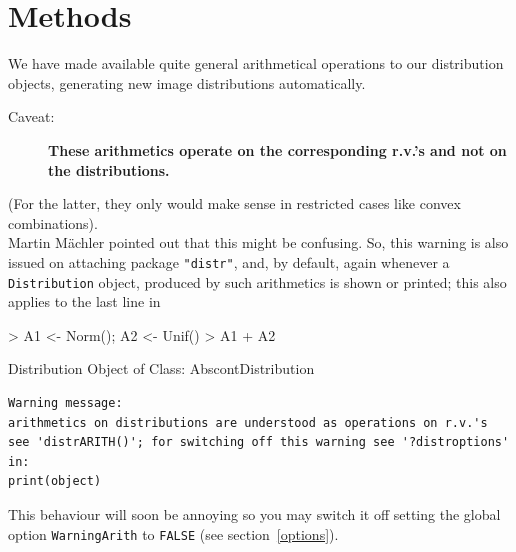 \documentclass[11pt]{article}
\newcommand{\code}[1]{{\tt #1}}
\newcommand{\pkg}[1]{{\tt "#1"}}
\begin{document}
\section{Methods}\label{methods}
%
We have made available quite general arithmetical operations to our distribution 
objects, generating new image distributions automatically.

\begin{description}
  \item[{\Large \sc Caveat:\/}] {\bf These arithmetics
operate on the corresponding r.v.'s and {\bf not} on the distributions.}
\end{description}
(For the latter, they only would make sense in restricted cases like convex 
 combinations).\\

Martin M\"achler pointed out that this might be confusing. So, this warning is 
also issued on attaching package \pkg{distr}, and,  by default, again whenever a 
\code{Distribution} object, produced by such arithmetics is shown or printed; 
this also applies to the last line in
\begin{Schunk}
\begin{Sinput}
>   A1 <- Norm(); A2 <- Unif()
>   A1 + A2
\end{Sinput}
\begin{Soutput}
Distribution Object of Class: AbscontDistribution
\end{Soutput}
\end{Schunk}
\begin{verbatim}
Warning message:
arithmetics on distributions are understood as operations on r.v.'s
see 'distrARITH()'; for switching off this warning see '?distroptions' in: 
print(object)
\end{verbatim}
This behaviour will soon be annoying so you may switch it off setting the global 
option
\code{WarningArith} to \code{FALSE} (see section~\ref{options}).
%
\end{document}
